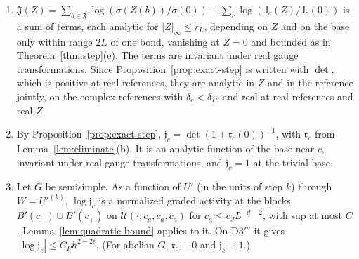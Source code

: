 \begin{proposition}[Jacobians]\label{prop:jacobians}
\begin{enumerate}[label=(\alph*)]
\item $\mathfrak J(Z)=\sum_{b\in\mathfrak F}\log(\sigma(Z(b))/\sigma(0))+\sum_c\log(\mathsf J_c(Z)/\mathsf J_c(0))$ is a sum of terms, each analytic for $|Z|_\infty\le r_L$, depending on $Z$ and on the base only within range $2L$ of one bond, vanishing at $Z=0$ and bounded as in Theorem~\ref{thm:step}(e). The terms are invariant under real gauge transformations. Since Proposition~\ref{prop:exact-step} is written with $\det$, which is positive at real references, they are analytic in $Z$ and in the reference jointly, on the complex references with $\delta_c<\delta_P$, and real at real references and real $Z$.
\item By Proposition~\ref{prop:exact-step}, $\mathfrak j_c=\det(1+\mathfrak r_c(0))^{-1}$, with $\mathfrak r_c$ from Lemma~\ref{lem:eliminate}(b). It is an analytic function of the base near $c$, invariant under real gauge transformations, and $\mathfrak j_c=1$ at the trivial base.
\item Let $G$ be semisimple. As a function of $U'$ (in the units of step $k$) through $W=U'^{(k)}$, $\log\mathfrak j_c$ is a normalized graded activity at the blocks $B'(c_-)\cup B'(c_+)$ on $\mathcal U(\cdot;c_a,c_a,c_a)$ for $c_a\le c_JL^{-d-2}$, with sup at most $C$. Lemma~\ref{lem:quadratic-bound} applies to it. On D3$'''$ it gives $|\log\mathfrak j_c|\le C_Ph^{2-2\epsilon}$. (For abelian $G$, $\mathfrak r_c\equiv0$ and $\mathfrak j_c\equiv1$.)
\end{enumerate}
\end{proposition}

